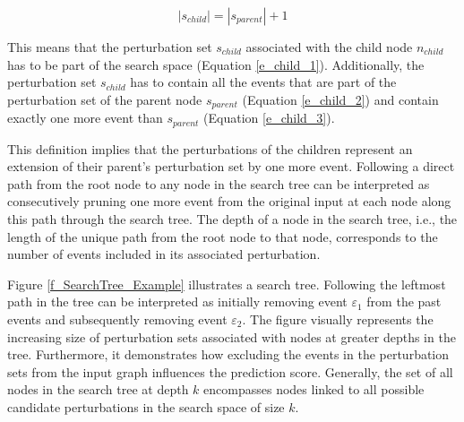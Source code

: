 \begin{equation}
    \label{e_child_3}
    |s_{child}| = |s_{parent}| + 1
\end{equation}

This means that the perturbation set $s_{child}$ associated with the child node $n_{child}$ has to be part of the search space (Equation \ref{e_child_1}). Additionally, the perturbation set $s_{child}$ has to contain all the events that are part of the perturbation set of the parent node $s_{parent}$ (Equation \ref{e_child_2}) and contain exactly one more event than $s_{parent}$ (Equation \ref{e_child_3}).


This definition implies that the perturbations of the children represent an extension of their parent's perturbation set by one more event. Following a direct path from the root node to any node in the search tree can be interpreted as consecutively pruning one more event from the original input at each node along this path through the search tree. The depth of a node in the search tree, i.e., the length of the unique path from the root node to that node, corresponds to the number of events included in its associated perturbation.

\vspace{0.5cm}

Figure \ref{f_SearchTree_Example} illustrates a search tree. Following the leftmost path in the tree can be interpreted as initially removing event $\varepsilon_1$ from the past events and subsequently removing event $\varepsilon_2$. The figure visually represents the increasing size of perturbation sets associated with nodes at greater depths in the tree. Furthermore, it demonstrates how excluding the events in the perturbation sets from the input graph influences the prediction score. Generally, the set of all nodes in the search tree at depth $k$ encompasses nodes linked to all possible candidate perturbations in the search space of size $k$.


